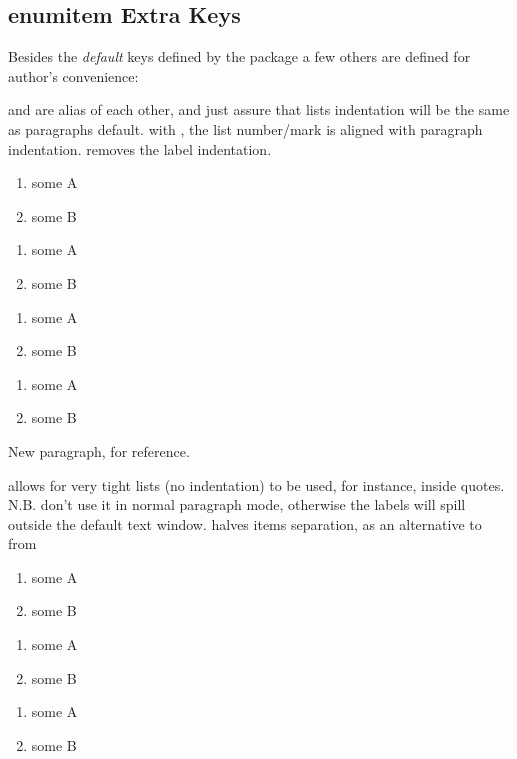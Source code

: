 \documentclass[dctools,english]{ufrgscca} %
\begin{document}
\subsection{enumitem Extra Keys}
Besides the \emph{default} keys defined by the  package a few others are defined for author's convenience:
\begin{Keys}
	  and  are alias of each other, and just assure that lists indentation will be the same as paragraphs default.
	 with , the list number/mark is aligned with paragraph indentation.
	  removes the label indentation.

	\begin{stcode}[st=enumA]
\begin{enumerate}[tcc]
	\item some A
	\item some B
\end{enumerate}
\begin{enumerate}
	\item some A
	\item some B
\end{enumerate}
\begin{enumerate}[parindent]
	\item some A
	\item some B
\end{enumerate}
\begin{enumerate}[noindent]
	\item some A
	\item some B
\end{enumerate}

New paragraph, for reference.
\end{stcode}


	 allows for very tight lists (no indentation) to be used, for instance, inside quotes. N.B. don't use it in normal paragraph mode, otherwise the labels will spill outside the default text window.
	  halves items separation, as an alternative to  from 
	\begin{stcode}[st=enumB]
	\begin{enumerate}[tcc]
		\item some A
		\item some B
	\end{enumerate}
	\begin{enumerate}
		\item some A
		\item some B
	\end{enumerate}
	\begin{enumerate}
		\item some A
		\item some B
	\end{enumerate}
\end{stcode}


\end{Keys}
\end{document}
